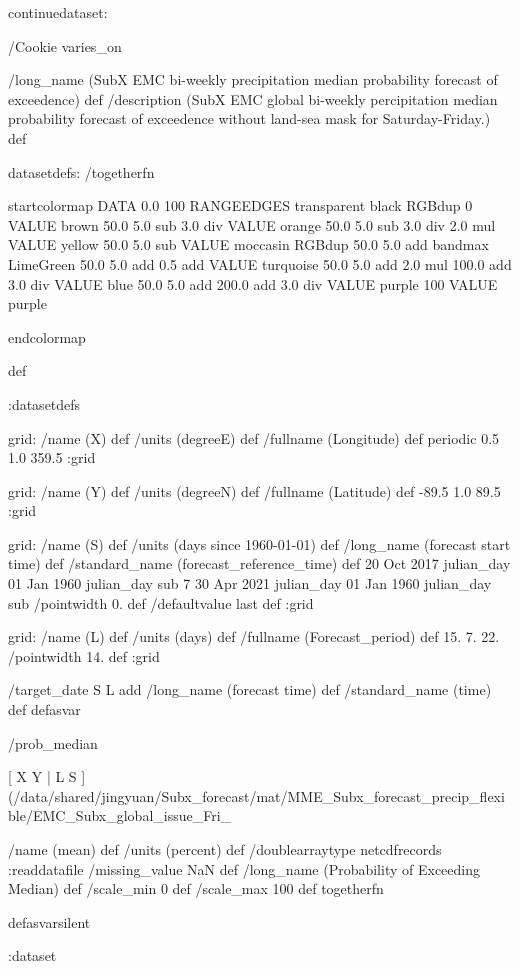 \begin{ingrid}

continuedataset:


/Cookie varies_on


/long_name (SubX EMC bi-weekly precipitation median probability forecast of exceedence) def
/description (SubX EMC global bi-weekly percipitation median probability forecast of exceedence without land-sea mask for Saturday-Friday.) def

datasetdefs:
/togetherfn {
startcolormap 
DATA 0.0 100 RANGEEDGES
     transparent black RGBdup
       0 VALUE
       brown 50.0
         5.0 sub
         3.0 div
         VALUE
         orange 50.0
          5.0 sub
          3.0 div
          2.0 mul
          VALUE
          yellow 50.0
           5.0 sub
           VALUE
          moccasin RGBdup 50.0
             5.0 add
             bandmax
             LimeGreen 50.0
              5.0 add
              0.5 add
              VALUE
              turquoise 50.0
               5.0 add
               2.0 mul
               100.0 add
               3.0 div
               VALUE
               blue 50.0
                5.0 add
                200.0 add
                3.0 div
                VALUE
               purple
                100 VALUE
                purple
 
endcolormap
} def 

:datasetdefs


grid:
/name (X) def
/units (degreeE) def
/fullname (Longitude) def
periodic
0.5 1.0 359.5
:grid

grid:
/name (Y) def
/units (degreeN) def
/fullname (Latitude) def
-89.5 1.0 89.5
:grid


grid:
/name (S) def
/units (days since 1960-01-01) def
/long_name (forecast start time) def
/standard_name (forecast_reference_time) def
20 Oct 2017 julian_day 01 Jan 1960 julian_day sub
7
30 Apr 2021 julian_day 01 Jan 1960 julian_day sub
/pointwidth 0. def
/defaultvalue { last } def
:grid

grid:
/name (L) def
/units (days) def
/fullname (Forecast_period) def
15. 7. 22.
/pointwidth 14. def
:grid


/target_date { S L add /long_name (forecast time) def /standard_name (time) def } defasvar

/prob_median {

[ X Y | L S ] (/data/shared/jingyuan/Subx_forecast/mat/MME_Subx_forecast_precip_flexible/EMC_Subx_global_issue_Fri_%

/name (mean) def
/units (percent) def
/doublearraytype netcdfrecords :readdatafile
/missing_value NaN def
/long_name (Probability of Exceeding Median) def
/scale_min 0 def
/scale_max 100 def
togetherfn
} defasvarsilent


:dataset
\end{ingrid}
